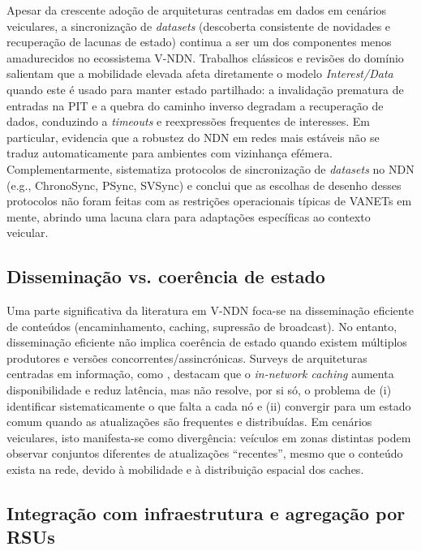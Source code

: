 Apesar da crescente adoção de arquiteturas centradas em dados em cenários veiculares, a sincronização de \textit{datasets} (descoberta consistente de novidades e recuperação de lacunas de estado) continua a ser um dos componentes menos amadurecidos no ecossistema \gls{V-NDN}. Trabalhos clássicos e revisões do domínio \cite{papadopoulos_lixia_2014,moll_sok_2022} salientam que a mobilidade elevada afeta diretamente o modelo \textit{Interest/Data} quando este é usado para manter estado partilhado: a invalidação prematura de entradas na \gls{PIT} e a quebra do caminho inverso degradam a recuperação de dados, conduzindo a \textit{timeouts} e reexpressões frequentes de interesses. Em particular, \cite{papadopoulos_lixia_2014} evidencia que a robustez do \gls{NDN} em redes mais estáveis não se traduz automaticamente para ambientes com vizinhança efémera. Complementarmente, \cite{moll_sok_2022} sistematiza protocolos de sincronização de \textit{datasets} no \gls{NDN} (e.g., ChronoSync, PSync, \gls{SVSync}) e conclui que as escolhas de desenho desses protocolos não foram feitas com as restrições operacionais típicas de \gls{VANETs} em mente, abrindo uma lacuna clara para adaptações específicas ao contexto veicular.

\subsection{Disseminação vs. coerência de estado}

Uma parte significativa da literatura em \gls{V-NDN} foca-se na disseminação eficiente de conteúdos (encaminhamento, caching, supressão de broadcast). No entanto, disseminação eficiente não implica coerência de estado quando existem múltiplos produtores e versões concorrentes/assincrónicas. Surveys de arquiteturas centradas em informação, como \cite{ahlgren_survey_2012}, destacam que o \textit{in-network caching} aumenta disponibilidade e reduz latência, mas não resolve, por si só, o problema de (i) identificar sistematicamente o que falta a cada nó e (ii) convergir para um estado comum quando as atualizações são frequentes e distribuídas. Em cenários veiculares, isto manifesta-se como divergência: veículos em zonas distintas podem observar conjuntos diferentes de atualizações “recentes”, mesmo que o conteúdo exista na rede, devido à mobilidade e à distribuição espacial dos caches.

\subsection{Integração com infraestrutura e agregação por \gls{RSUs}}

